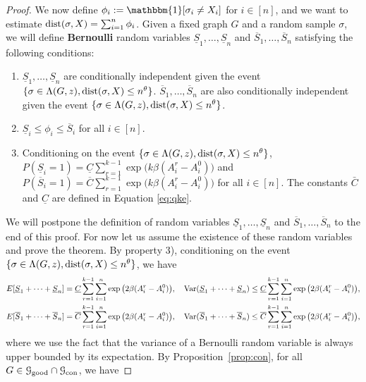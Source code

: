\documentclass{article}
\begin{document}
\begin{proof}
	We now define 
	$\phi_i := \mathbbm{1}[\sigma_i \neq X_i]$ for $i\in[n]$, and
	we want to estimate $\operatorname{dist}(\sigma,X)=\sum_{i=1}^n \phi_i$. 
	Given a fixed graph $G$ and a random sample $\sigma$, we will define {\bf Bernoulli} random variables $\underline{S}_1,\dots, \underline{S}_n$ and $\overline{S}_1,\dots,\overline{S}_n$ satisfying the following conditions:
	\begin{enumerate}
		\item $\underline{S}_1,\dots, \underline{S}_n$ are conditionally independent given the event $\{\sigma\in \Lambda(G,z) ,\operatorname{dist}(\sigma, X) \le n^{\theta}\}$. $\overline{S}_1,\dots,\overline{S}_n$ are also conditionally independent given the event $\{\sigma\in \Lambda(G,z) ,\operatorname{dist}(\sigma, X) \le n^{\theta}\}$.
		\item $\underline{S}_i\le \phi_i\le \overline{S}_i$ for all $i\in[n]$.
		\item Conditioning on the event $\{\sigma\in \Lambda(G,z) ,\operatorname{dist}(\sigma, X) \le n^{\theta}\}$, $P(\underline{S}_i=1)=\underline{C}
		\sum_{r=1}^{k-1}\exp\big(k\beta (A^r_i-A^0_i) \big)$ and $P(\overline{S}_i=1)=\overline{C}
		\sum_{r=1}^{k-1}\exp\big(k\beta (A^r_i-A^0_i) \big)$ for all $i\in[n]$. The constants $\bar{C}$ and $\underline{C}$ are defined in Equation \eqref{eq:qke}.
	\end{enumerate}
	We will postpone the definition of random variables $\underline{S}_1,\dots, \underline{S}_n$ and $\overline{S}_1,\dots,\overline{S}_n$ to the end of this proof. For now let us assume the existence of these random variables and prove the theorem.
	By property 3), conditioning on the event $\{\sigma\in \Lambda(G,z) ,\operatorname{dist}(\sigma, X) \le n^{\theta}\}$, we have
	\begin{align*}
	& E[\underline{S}_1 + \dots + \underline{S}_n] = \underline{C}
	\sum_{r=1}^{k-1}\sum_{i=1}^n \exp\big(2\beta (A^r_i-A^0_i) \big) , \quad
	\operatorname{Var}(\underline{S}_1 + \dots + \underline{S}_n) \le \underline{C}
	\sum_{r=1}^{k-1}\sum_{i=1}^n \exp\big(2\beta (A^r_i-A^0_i) \big)
 	, \\
	& E[\overline{S}_1 + \dots + \overline{S}_n] = \overline{C}
	\sum_{r=1}^{k-1}\sum_{i=1}^n \exp\big(2\beta (A^r_i-A^0_i) \big) , \quad
	\operatorname{Var}(\overline{S}_1 + \dots + \overline{S}_n) \le \overline{C}
	\sum_{r=1}^{k-1}\sum_{i=1}^n \exp\big(2\beta (A^r_i-A^0_i) \big) ,
	\end{align*}
	where we use the fact that the variance of a Bernoulli random variable is always upper bounded by its expectation.
	By Proposition~\ref{prop:con}, for all $G\in\mathcal{G}_{\operatorname{good}}\cap\mathcal{G}_{\operatorname{con}}$, we have 

\end{proof}
\end{document}
